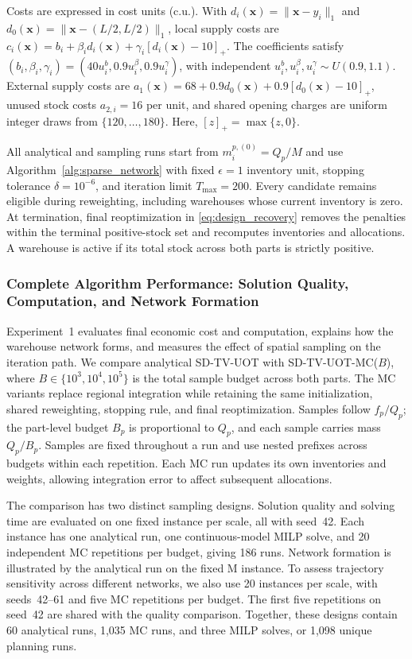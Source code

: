 \documentclass[a4paper,fleqn]{cas-sc}
\theoremstyle{remark}
\theoremstyle{plain}
\begin{document}
Costs are expressed in cost units (c.u.). With $d_i(\bm x)=\|\bm x-y_i\|_1$ and $d_0(\bm x)=\|\bm x-(L/2,L/2)\|_1$, local supply costs are $c_i(\bm x)=b_i+\beta_i d_i(\bm x)+\gamma_i[d_i(\bm x)-10]_+$. The coefficients satisfy $(b_i,\beta_i,\gamma_i)=(40u_i^b,0.9u_i^\beta,0.9u_i^\gamma)$, with independent $u_i^b,u_i^\beta,u_i^\gamma\sim U(0.9,1.1)$. External supply costs are $a_1(\bm x)=68+0.9d_0(\bm x)+0.9[d_0(\bm x)-10]_+$, unused stock costs $a_{2,i}=16$ per unit, and shared opening charges are uniform integer draws from $\{120,\ldots,180\}$. Here, $[z]_+=\max\{z,0\}$.

All analytical and sampling runs start from $m_i^{p,(0)}=Q_p/M$ and use Algorithm~\ref{alg:sparse_network} with fixed $\epsilon=1$ inventory unit, stopping tolerance $\delta=10^{-6}$, and iteration limit $T_{\max}=200$. Every candidate remains eligible during reweighting, including warehouses whose current inventory is zero. At termination, final reoptimization in \eqref{eq:design_recovery} removes the penalties within the terminal positive-stock set and recomputes inventories and allocations. A warehouse is active if its total stock across both parts is strictly positive.

\subsubsection*{Complete Algorithm Performance: Solution Quality, Computation, and Network Formation}\label{exp1}

Experiment~1 evaluates final economic cost and computation, explains how the warehouse network forms, and measures the effect of spatial sampling on the iteration path. We compare analytical SD-TV-UOT with SD-TV-UOT-MC($B$), where $B\in\{10^3,10^4,10^5\}$ is the total sample budget across both parts. The MC variants replace regional integration while retaining the same initialization, shared reweighting, stopping rule, and final reoptimization. Samples follow $f_p/Q_p$; the part-level budget $B_p$ is proportional to $Q_p$, and each sample carries mass $Q_p/B_p$. Samples are fixed throughout a run and use nested prefixes across budgets within each repetition. Each MC run updates its own inventories and weights, allowing integration error to affect subsequent allocations.

The comparison has two distinct sampling designs. Solution quality and solving time are evaluated on one fixed instance per scale, all with seed~42. Each instance has one analytical run, one continuous-model MILP solve, and 20 independent MC repetitions per budget, giving 186 runs. Network formation is illustrated by the analytical run on the fixed M instance. To assess trajectory sensitivity across different networks, we also use 20 instances per scale, with seeds~42--61 and five MC repetitions per budget. The first five repetitions on seed~42 are shared with the quality comparison. Together, these designs contain 60 analytical runs, 1,035 MC runs, and three MILP solves, or 1,098 unique planning runs.
\end{document}

